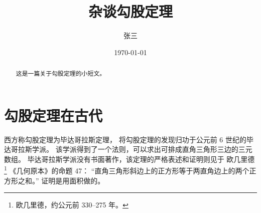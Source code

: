 \documentclass[UTF8,c5size]{ctexart}
\title{\heiti 杂谈勾股定理}
\author{\kaishu 张三}
\date{\today}
\begin{document}
\maketitle

\begin{abstract}
        这是一篇关于勾股定理的小短文。
\end{abstract}

\tableofcontents

\section{勾股定理在古代}
        西方称勾股定理为毕达哥拉斯定理，
        将勾股定理的发现归功于公元前 6 世纪的毕达哥拉斯学派\cite{Kline}。
        该学派得到了一个法则，可以求出可排成直角三角形三边的三元数组。
        毕达哥拉斯学派没有书面著作，该定理的严格表述和证明则见于
        欧几里德\footnote{欧几里德，约公元前 330--275 年。}
        《几何原本》的命题 47：
        “直角三角形斜边上的正方形等于两直角边上的两个正方形之和。”
        证明是用面积做的。
\end{document}
